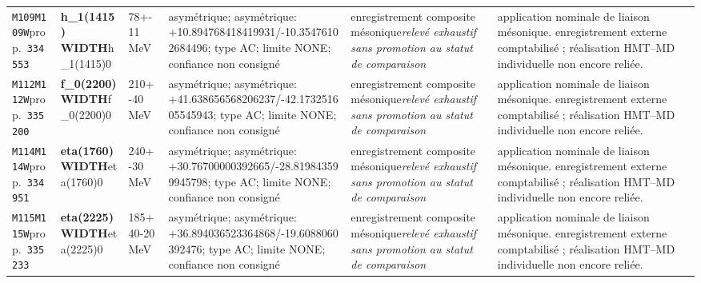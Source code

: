 \begin{landscape}
\begin{longtable}{L{1.85cm}L{4.45cm}L{2.35cm}L{4.05cm}L{3.35cm}L{7.15cm}}
\texttt{M109}\newline \texttt{M109W}\newline prop.\ \texttt{334553} & \textbf{h\_\allowbreak{}1(1415) WIDTH}\newline h\_\allowbreak{}1(1415)0 & 78+-11\,MeV & asymétrique; asymétrique: +10.894768418419931/-10.35476102684496; type AC; limite NONE; confiance non consigné & enregistrement composite mésonique\newline \emph{relevé exhaustif sans promotion au statut de comparaison} & application nominale de liaison mésonique. enregistrement externe comptabilisé ; réalisation HMT--MD individuelle non encore reliée. \\
\texttt{M112}\newline \texttt{M112W}\newline prop.\ \texttt{335200} & \textbf{f\_\allowbreak{}0(2200) WIDTH}\newline f\_\allowbreak{}0(2200)0 & 210+-40\,MeV & asymétrique; asymétrique: +41.638656568206237/-42.173251605545943; type AC; limite NONE; confiance non consigné & enregistrement composite mésonique\newline \emph{relevé exhaustif sans promotion au statut de comparaison} & application nominale de liaison mésonique. enregistrement externe comptabilisé ; réalisation HMT--MD individuelle non encore reliée. \\
\texttt{M114}\newline \texttt{M114W}\newline prop.\ \texttt{334951} & \textbf{eta(1760) WIDTH}\newline eta(1760)0 & 240+-30\,MeV & asymétrique; asymétrique: +30.76700000392665/-28.819843599945798; type AC; limite NONE; confiance non consigné & enregistrement composite mésonique\newline \emph{relevé exhaustif sans promotion au statut de comparaison} & application nominale de liaison mésonique. enregistrement externe comptabilisé ; réalisation HMT--MD individuelle non encore reliée. \\
\texttt{M115}\newline \texttt{M115W}\newline prop.\ \texttt{335233} & \textbf{eta(2225) WIDTH}\newline eta(2225)0 & 185+40-20\,MeV & asymétrique; asymétrique: +36.894036523364868/-19.6088060392476; type AC; limite NONE; confiance non consigné & enregistrement composite mésonique\newline \emph{relevé exhaustif sans promotion au statut de comparaison} & application nominale de liaison mésonique. enregistrement externe comptabilisé ; réalisation HMT--MD individuelle non encore reliée. \\

\end{longtable}
\end{landscape}
